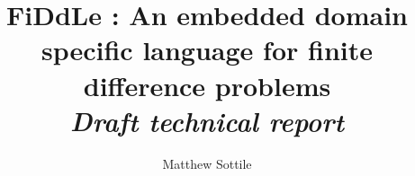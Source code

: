 \documentclass{article}
\newcommand{\FIDDLE}{FiDdLe{ }}
\begin{document}
\title{\FIDDLE: An embedded domain specific language for finite difference problems\\ \emph{Draft technical report}}

\author{Matthew Sottile}
\date{}

\lstset{
  basicstyle=\footnotesize\ttfamily,
  language=C,
  breaklines=true,
  frame=single
}

\maketitle

%


% 





\end{document}
